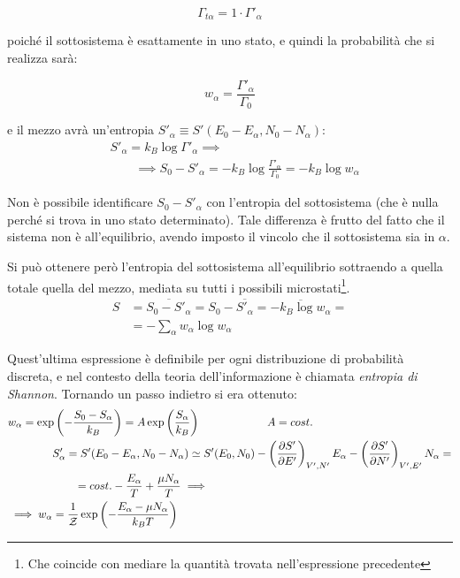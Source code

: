 \begin{equation*}
\Gamma_{t\alpha} = 1 \cdot \Gamma'_\alpha
\end{equation*}

\noindent poiché il sottosistema è esattamente in uno stato, e quindi la probabilità che si realizza sarà:

\begin{equation*}
w_\alpha = \frac{\Gamma'_{\alpha}}{\Gamma_0}
\end{equation*}

\noindent e il mezzo avrà un'entropia $S'_\alpha \equiv S'(E_0 - E_\alpha, N_0 - N_\alpha)$:
\begin{align*}
&S'_\alpha = k_B \log \Gamma'_\alpha \implies \\
& \qquad \implies S_0 - S'_\alpha = - k_B \log \frac{\Gamma'_{\alpha}}{\Gamma_0} = - k_B \log w_\alpha
\end{align*}

Non è possibile identificare $S_0 - S'_\alpha$ con l'entropia del sottosistema (che è nulla perché si trova in uno stato determinato). Tale differenza è frutto del fatto che il sistema non è all'equilibrio, avendo imposto il vincolo che il sottosistema sia in $\alpha$.

Si può ottenere però l'entropia del sottosistema all'equilibrio sottraendo a quella totale quella del mezzo, mediata su tutti i possibili microstati\footnote{Che coincide con mediare la quantità trovata nell'espressione precedente}.
\begin{align*}
S &= \overline{S_0 - S'_\alpha} = S_0 - \overline{S'_\alpha} = \overline{- k_B \log w_\alpha} = \\
&= - \sum_{\alpha} w_\alpha \log w_\alpha
\end{align*}

Quest'ultima espressione è definibile per ogni distribuzione di probabilità discreta, e nel contesto della teoria dell'informazione è chiamata \textit{entropia di Shannon}.
Tornando un passo indietro si era ottenuto:
\begin{align*}
	&w_\alpha = \exp \left(- \frac{S_0 - S_\alpha}{k_B}\right) = A \exp \left(\frac{S_\alpha}{k_B}\right) \qquad \qquad \qquad A = cost.\\
	&\qquad \qquad S'_\alpha = S'(E_0 - E_\alpha, N_0 - N_\alpha) \simeq S'(E_0, N_0) - \left(\frac{\partial {S'}}{\partial {E'}}\right)_{V',N'} E_\alpha - \left(\frac{\partial {S'}}{\partial {N'}}\right)_{V',E'} N_\alpha =\\
	&\qquad \qquad \qquad = cost. - \frac{E_\alpha}{T} + \frac{\mu N_\alpha}{T} \implies\\
	&\implies w_\alpha = \frac{1}{\mathcal{Z}} \exp \left(- \frac{E_\alpha - \mu N_\alpha}{k_BT}\right)
\end{align*}

